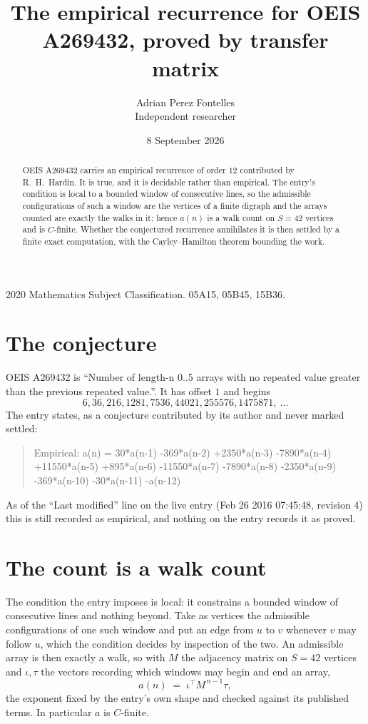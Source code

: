\documentclass[11pt,a4paper]{article}
\title{The empirical recurrence for OEIS A269432, proved by transfer matrix}
\author{Adrian Perez Fontelles\\ \small Independent researcher}
\date{8 September 2026}
\theoremstyle{plain}
\theoremstyle{definition}
\begin{document}
\maketitle

\begin{abstract}
OEIS A269432 carries an empirical recurrence of order $12$ contributed by R.~H.~Hardin. It is
true, and it is decidable rather than empirical. The entry's condition is local to a bounded window of consecutive lines, so
the admissible configurations of such a window are the vertices of a finite digraph and the
arrays counted are exactly the walks in it; hence $a(n)$ is a walk count on $S=42$ vertices
and is $C$-finite. Whether the conjectured recurrence annihilates it is then settled by a
finite exact computation, with the Cayley--Hamilton theorem bounding the work.
\end{abstract}

\noindent\small 2020 Mathematics Subject Classification. 05A15, 05B45, 15B36.\normalsize

\section{The conjecture}

OEIS A269432 is ``Number of length-n 0..5 arrays with no repeated value greater than the previous repeated value.''. It has offset $1$ and begins
\[
6, 36, 216, 1281, 7536, 44021, 255576, 1475871,\ \dots
\]
The entry states, as a conjecture contributed by its author and never marked settled:
\begin{quote}
Empirical: a(n) = 30*a(n-1) -369*a(n-2) +2350*a(n-3) -7890*a(n-4) +11550*a(n-5) +895*a(n-6) -11550*a(n-7) -7890*a(n-8) -2350*a(n-9) -369*a(n-10) -30*a(n-11) -a(n-12)
\end{quote}
As of the ``Last modified'' line on the live entry (Feb 26 2016 07:45:48, revision 4) this is still
recorded as empirical, and nothing on the entry records it as proved.

\section{The count is a walk count}

The condition the entry imposes is local: it constrains a bounded window of consecutive lines and nothing beyond. Take as
vertices the admissible configurations of one such window and put an edge from $u$ to $v$
whenever $v$ may follow $u$, which the condition decides by inspection of the two. An
admissible array is then exactly a walk, so with $M$ the adjacency matrix on $S=42$ vertices
and $\iota,\tau$ the vectors recording which windows may begin and end an array,
\[
a(n)\;=\;\iota^{\!\top}M^{\,n-1}\tau ,
\]
the exponent fixed by the entry's own shape and checked against its published terms. In
particular $a$ is $C$-finite.
\end{document}
